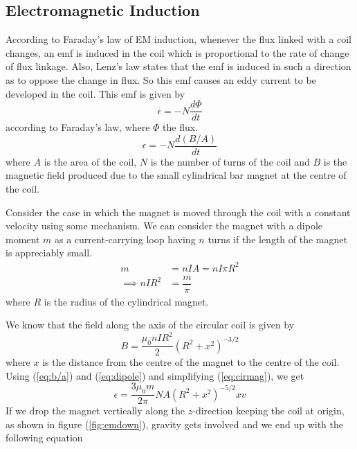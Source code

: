\documentclass[%
 aip,
 amsmath,amssymb,
 reprint, floatfix%
]{revtex4-1}
\begin{document}
    \subsection{Electromagnetic Induction}
    According to Faraday’s law of EM induction, whenever the flux linked with a coil changes, an emf is induced in the coil which is proportional to the rate of change of flux linkage. Also, Lenz’s law states that the emf is induced in such a direction as to oppose the change in flux. So this emf causes an eddy current to be developed in the coil. This emf is given by
    \begin{equation}
        \epsilon = -N \dfrac{d \Phi}{dt}
    \end{equation}
    according to Faraday’s law, where $\Phi$ the flux.
    \begin{equation}
    \label{eq:b/a}
        \epsilon = -N \dfrac{d (B/A)}{dt}
    \end{equation}
    where $A$ is the area of the coil, $N$ is the number of turns of the coil and $B$ is the magnetic field produced due to the small cylindrical bar magnet at the centre of the coil.
    \par
    Consider the case in which the magnet is moved through the coil with a constant velocity using some mechanism. We can consider the magnet with a dipole moment $m$ as a current-carrying loop having $n$ turns if the length of the magnet is appreciably small.
    \begin{equation}
    \label{eq:dipole}
        \begin{split}
            m &= nIA = n I \pi R^2 \\
            \implies nI R^2 &= \dfrac{m}{\pi}
        \end{split}
    \end{equation}
    where $R$ is the radius of the cylindrical magnet.
    \par
    We know that the field along the axis of the circular coil is given by
    \begin{equation}
    \label{eq:cirmag}
        B = \dfrac{\mu_0 n I R^2}{2} (R^2 +x^2)^{-3/2}
    \end{equation}
    where $x$ is the distance from the centre of the magnet to the centre of the coil. Using (\ref{eq:b/a}) and (\ref{eq:dipole}) and simplifying (\ref{eq:cirmag}), we get
    \begin{equation}
        \epsilon = \dfrac{3 \mu_0 m}{2 \pi} NA (R^2 +x^2)^{-5/2}xv
    \end{equation}
    If we drop the magnet vertically along the $z$-direction keeping the coil at origin, as shown in figure (\ref{fig:emdown}), gravity gets involved and we end up with the following equation
\end{document}
